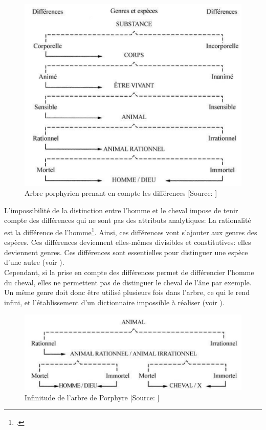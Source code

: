 

\begin{figure}[!h]
	\centering
	\includegraphics[width=12cm]{images/arbre_porprhyre_differences.png}
	\caption[Arbre porphyrien prenant en compte les différences]{Arbre porphyrien prenant en compte les différences [Source: \cite[chap.1]{eco_arbre_2010}]}
	\label{arbre_porphyre_differences}
\end{figure}

L'impossibilité de la distinction entre l'homme et le cheval impose de tenir compte des différences qui ne sont pas des attributs analytiques: \og La rationalité est la différence de l'homme\fg{}\footcite[chap.1]{eco_arbre_2010}. Ainsi, ces différences vont s'ajouter aux genres des espèces. Ces différences deviennent elles-mêmes divisibles et constitutives: elles deviennent genres. Ces différences sont essentielles pour distinguer une espèce d'une autre (voir ).\\

Cependant, si la prise en compte des différences permet de différencier l'homme du cheval, elles ne permettent pas de distinguer le cheval de l'âne par exemple. Un même genre doit donc être utilisé plusieurs fois dans l'arbre, ce qui le rend infini, et l'établissement d'un dictionnaire impossible à réaliser (voir ).\\

\begin{figure}[!h]
	\centering
	\includegraphics[width=12cm]{images/arbre_porphyre_boucle.png}
	\caption[Infinitude de l'arbre de Porphyre]{Infinitude de l'arbre de Porphyre [Source: \cite[chap.1]{eco_arbre_2010}]}
	\label{arbre_porphyre_boucle}
\end{figure}

